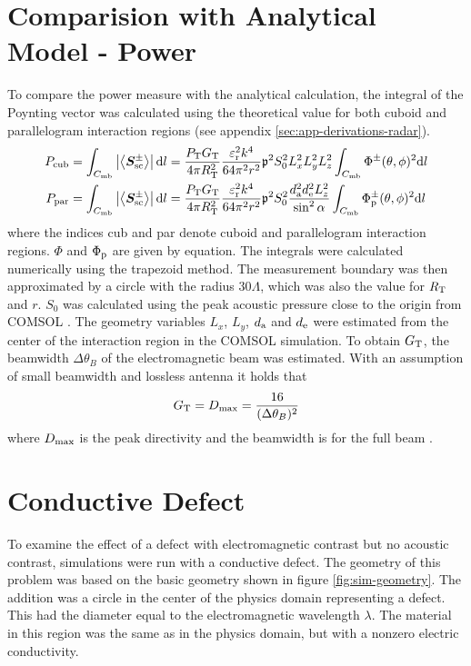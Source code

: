 \documentclass[11pt,twoside]{eitExjobb}
\begin{document}
	\section{Comparision with Analytical Model - Power}
	To compare the power measure with the analytical calculation, the integral of the Poynting vector was calculated using the theoretical value for both cuboid and parallelogram interaction regions (see appendix \ref{sec:app-derivations-radar}).
	\begin{align*}
	P_{\mathrm{cub}} &= \int_{C_{\mathrm{mb}}} \left| \left< \bm{S}_{\mathrm{sc}}^\pm \right> \right| \mathrm{d}l
	= \frac{P_{\mathrm{T}} G_{\mathrm{T}}}{4\pi R_{\mathrm{T}}^2} \frac{\varepsilon_{\mathrm{r}}^2 k^4}{64 \pi^2 r^2} \mathfrak{p}^2 S_0^2 L_{x}^2 L_{y}^2 L_{z}^2 \int_{C_{\mathrm{mb}}} \Phi^\pm (\theta,\phi)^2 \mathrm{d}l \\
	P_{\mathrm{par}} &= \int_{C_{\mathrm{mb}}} \left| \left< \bm{S}_{\mathrm{sc}}^\pm \right> \right| \mathrm{d}l
	= \frac{P_{\mathrm{T}} G_{\mathrm{T}}}{4\pi R_{\mathrm{T}}^2} \frac{\varepsilon_{\mathrm{r}}^2 k^4}{64 \pi^2 r^2} \mathfrak{p}^2 S_0^2 \frac{d_{\mathrm{a}}^2 d_{\mathrm{e}}^2 L_z^2}{\sin^2{\alpha}} \int_{C_{\mathrm{mb}}} \Phi_{\mathrm{p}}^\pm (\theta,\phi)^2 \mathrm{d}l
	\end{align*}
	where the indices cub and par denote cuboid and parallelogram interaction regions. $\Phi$ and $\Phi_{\mathrm{p}}$ are given by equation.  The integrals were calculated numerically using the trapezoid method. The measurement boundary was then approximated by a circle with the radius $30\Lambda$, which was also the value for $R_{\mathrm{T}}$ and $r$. $S_0$ was calculated using the peak acoustic pressure close to the origin from COMSOL . The geometry variables $L_x$, $L_y$, $d_{\mathrm{a}}$ and $d_{\mathrm{e}}$ were estimated from the center of the interaction region in the COMSOL simulation.
	To obtain $G_{\mathrm{T}}$, the beamwidth $\Delta \theta_B$ of the electromagnetic beam was estimated. With an assumption of small beamwidth and lossless antenna it holds that \cite{Orfanidis2016}
	\begin{equation*}
	G_{\mathrm{T}} = D_{\mathrm{max}} = \frac{16}{(\Delta \theta_B)^2}
	\end{equation*}
	where $D_{\mathrm{max}}$ is the peak directivity and the beamwidth is for the full beam \cite{Orfanidis2016}.
	
	\section{Conductive Defect}
	To examine the effect of a defect with electromagnetic contrast but no acoustic contrast, simulations were run with a conductive defect. The geometry of this problem was based on the basic geometry shown in figure \ref{fig:sim-geometry}. The addition was a circle in the center of the physics domain representing a defect. This had the diameter equal to the electromagnetic wavelength $\lambda$. The material in this region was the same as in the physics domain, but with a nonzero electric conductivity.
	
\end{document}
